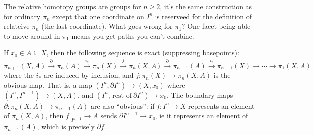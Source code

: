         The relative homotopy groups are groups for $n\geq 2$, it's the same construction as for ordinary $\pi_n $ except that one coordinate on $I^n $ is reserveed for the definition of relateive $\pi_n $ (the last coordinate). What goes wrong for $\pi_1$? One facet being able to move around in $\pi_1$ means you get paths you can't combine.
        \begin{theorem}
            If $x_0\in A\subseteq X$, then the following sequence is exact (suppressing basepoints): \[
                \pi_{n+1}(X,A)\overset{\partial }{\longrightarrow}  \pi_n (A) \overset{i_*}{\longrightarrow} \pi_n (X)\overset{j}{\longrightarrow}  \pi_n (X,A) \overset{\partial }{\longrightarrow}  \pi_{n-1}(A) \overset{i_*}{\longrightarrow} \pi_{n-1}(X)\to \cdots \to \pi_1(X,A)
            \] where the $i_*$ are induced by inclusion, and $j\colon \pi_n (X) \to \pi_n (X,A)$ is the obvious map. That is, a map $(I^n ,\partial I^n )\to (X,x_0)$ where $(I^n ,I^{n-1})\to (X,A)$, and $(I^n , \, \text{rest of} \ \partial I^n )\to x_0$. The boundary maps $\partial \colon \pi_n (X,A) \to \pi_{n-1}(A)$ are also ``obvious'': if $f\colon I^n  \to X$ represents an element of $\pi_n (X,A)$, then $\left. f \right| _{I^{n-1}}\to A$ sends $\partial I^{n-1}\to x_0$, ie it represents an element of $\pi_{n-1}(A)$, which is precisely $\partial f$.
\end{theorem}
